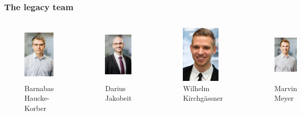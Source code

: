 \begin{frame}
\frametitle{The legacy team}
\vspace{-0.5cm}
\begin{columns}[t]

	\begin{figure}
		\centering
			\includegraphics[height=2.75cm]{fig/lec01/Hauke.jpg}
			\caption*{Barnabas \\Haucke-Korber}
	\end{figure}

	\begin{figure}
		\centering
			\includegraphics[height=2.75cm]{fig/lec01/Jakobeit.jpg}
			\caption*{Darius \\Jakobeit}
	\end{figure}
			
	\begin{figure}
		\centering
			\includegraphics[height=2.75cm]{fig/lec01/Kirchgaessner.png}
			\caption*{Wilhelm Kirchgässner}
	\end{figure}
	
	\begin{figure}
		\centering
			\includegraphics[height=2.75cm]{fig/lec01/Meyer.jpg}
			\caption*{Marvin \\Meyer}
	\end{figure}
	

\end{columns}
\end{frame}
